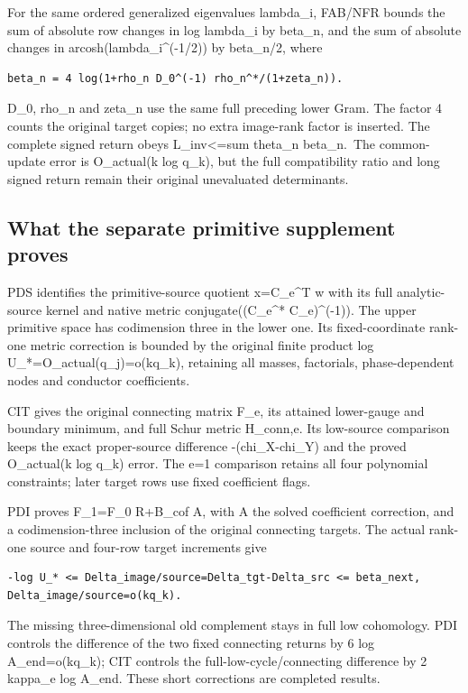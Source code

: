 \documentclass[
]{article}
\begin{document}
For the same ordered generalized eigenvalues lambda\_i, FAB/NFR bounds
the sum of absolute row changes in log lambda\_i by beta\_n, and the sum
of absolute changes in arcosh(lambda\_i\^{}(-1/2)) by beta\_n/2, where

\begin{verbatim}
beta_n = 4 log(1+rho_n D_0^(-1) rho_n^*/(1+zeta_n)).
\end{verbatim}

D\_0, rho\_n and zeta\_n use the same full preceding lower Gram. The
factor 4 counts the original target copies; no extra image-rank factor
is inserted. The complete signed return obeys
\textbar L\_inv\textbar\textless=sum theta\_n beta\_n.~The common-
update error is O\_actual(k log q\_k), but the full compatibility ratio
and long signed return remain their original unevaluated determinants.

\subsection{What the separate primitive supplement
proves}\label{what-the-separate-primitive-supplement-proves}

PDS identifies the primitive-source quotient x=C\_e\^{}T w with its full
analytic-source kernel and native metric conjugate((C\_e\^{}*
C\_e)\^{}(-1)). The upper primitive space has codimension three in the
lower one. Its fixed-coordinate rank-one metric correction is bounded by
the original finite product log U\_*=O\_actual(q\_j)=o(kq\_k), retaining
all masses, factorials, phase-dependent nodes and conductor
coefficients.

CIT gives the original connecting matrix F\_e, its attained lower-gauge
and boundary minimum, and full Schur metric H\_conn,e. Its low-source
comparison keeps the exact proper-source difference -(chi\_X-chi\_Y) and
the proved O\_actual(k log q\_k) error. The e=1 comparison retains all
four polynomial constraints; later target rows use fixed coefficient
flags.

PDI proves F\_1=F\_0 R+B\_cof A, with A the solved coefficient
correction, and a codimension-three inclusion of the original connecting
targets. The actual rank-one source and four-row target increments give

\begin{verbatim}
-log U_* <= Delta_image/source=Delta_tgt-Delta_src <= beta_next,
Delta_image/source=o(kq_k).
\end{verbatim}

The missing three-dimensional old complement stays in full low
cohomology. PDI controls the difference of the two fixed connecting
returns by 6 log A\_end=o(kq\_k); CIT controls the
full-low-cycle/connecting difference by 2 kappa\_e log A\_end. These
short corrections are completed results.
\end{document}
